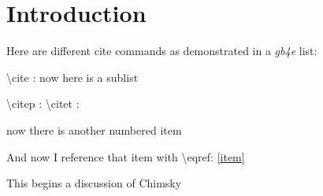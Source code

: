 
\chapter[Introduction]%
{Introduction}\label{chap:Intro} %

Here are different cite commands as demonstrated in a \emph{gb4e} list:

\begin{exe}
    \ex \textbackslash cite : \cite{chomsky-why-2016}
    \ex now here is a sublist \begin{xlista}
    \ex \textbackslash citep : \citep{chomsky-why-2016}
    \ex \textbackslash citet{} : \citet{chomsky-why-2016}
    \end{xlista}
    \ex\label{item} now there is another numbered item
\end{exe}
And now I reference that item with \textbackslash eqref: \eqref{item}

This begins a discussion of Chimsky \todocite{}
